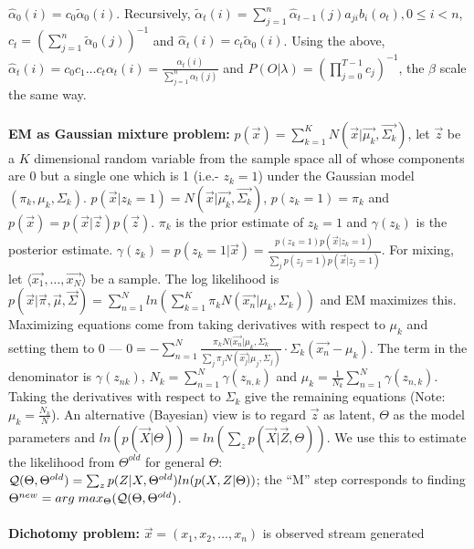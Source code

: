 $\hat{\alpha}_0(i)= c_0 \tilde{\alpha}_0(i)$.  Recursively,
$\tilde{\alpha}_t(i)= \sum_{j=1}^{n} \hat{\alpha}_{t-1}(j) a_{ji}b_i(o_t),
0 \le i <n$,
$c_t= (\sum_{j=1}^{n} \tilde{\alpha}_0(j))^{-1}$ and
$\hat{\alpha}_t(i)= c_t \tilde{\alpha}_0(i)$.
Using the above, $\hat{\alpha}_t(i)= c_0 c_1 \ldots c_t \alpha_t(i)= {\frac {\alpha_t(i)}
{\sum_{j=1}^{n} \alpha_t(j)}}$ and $P(O|\lambda)= (\prod_{j=0}^{T-1} c_j)^{-1}$,
the $\beta$ scale the same way.
\\
\\
{\bf EM as Gaussian mixture problem:}
$p({\vec x})= \sum_{k=1}^K N({\vec x} | {\vec {\mu_k}}, {\vec {\Sigma_k}})$,
let ${\vec z}$ be a $K$ dimensional random variable from the
sample space all of whose components are $0$ but a single one which is 1 (i.e.- $z_k=1$) under
the Gaussian model $(\pi_k, \mu_k, \Sigma_k)$.
$p({\vec x}| z_k=1)= N({\vec x} | {\vec {\mu_k}}, {\vec {\Sigma_k}})$, $p(z_k=1)= \pi_k$ and
$p({\vec x})=
p({\vec x} | {\vec z}) p({\vec z})$.  $\pi_k$ is the prior estimate of
$z_k=1$ and $\gamma(z_k)$ is the posterior estimate.
$\gamma(z_k)= p(z_k=1| {\vec x})= {\frac {p(z_k=1) p({\vec x} | z_k=1)}
{\sum_j p(z_j=1) p({\vec x}| z_j=1)}}$.  For mixing, let 
$\langle {\vec {x_1}}, \ldots , {\vec {x_N}} \rangle$ be a sample.
The log likelihood is
$p({\vec x} | {\vec {\pi}}, {\vec {\mu}}, {\vec {\Sigma}}) =
\sum_{n=1}^N ln( \sum_{k=1}^K \pi_k N({\vec {x_n}}| \mu_k, \Sigma_k))$ and EM
maximizes this.  Maximizing equations come from taking derivatives with
respect to $\mu_k$ and setting them to $0$ --- 
$0= - \sum_{n=1}^N  {\frac {\pi_k N({\vec {x_n}}| \mu_k, \Sigma_k}
{\sum_j \pi_j N({\vec {x_j}}| \mu_j, \Sigma_j)}} \cdot 
\Sigma_k ({\vec {x_n}}- \mu_k)$.  The term in the denominator is 
$\gamma(z_{nk})$, $N_k= \sum_{n=1}^N \gamma(z_{n,k})$ and 
$\mu_k = {\frac 1 {N_k}} \sum_{n=1}^N \gamma(z_{n,k})$.  Taking the derivatives with respect
to $\Sigma_k$ give the remaining equations (Note: $\mu_k= {\frac {N_k} {N}}$).
An alternative (Bayesian) 
view is to regard ${\vec z}$ as latent, $\Theta$ as the model parameters
and $ln(p({\vec X} | \Theta))= ln(\sum_z p({\vec X} | {\vec Z}, \Theta))$.  We use
this to estimate the likelihood from $\Theta^{old}$ for general $\Theta$:
${\cal Q}(\Theta, \Theta^{old})= \sum_z p(Z| X, \Theta^{old}) ln(p(X,Z| \Theta))$; the
``M'' step corresponds to finding 
$\Theta^{new}= arg \; max_{\Theta} ({\cal Q} (\Theta, \Theta^{old})$.
\\
\\
{\bf Dichotomy problem:} ${\vec x}= (x_1 , x_2 , \ldots, x_n)$ is observed stream generated
